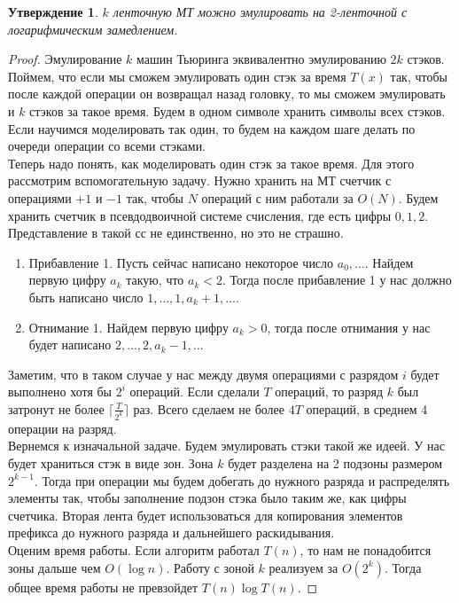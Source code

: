 \documentclass[12pt, letterpaper]{article}
\newtheorem{prop}{Утверждение}[section]
\begin{document}
\begin{prop}
$k$ ленточную МТ можно эмулировать на 2-ленточной с логарифмическим замедлением.
\end{prop}
\begin{proof}
Эмулирование $k$ машин Тьюринга эквивалентно эмулированию $2k$ стэков. Поймем, что если мы сможем эмулировать один стэк за время $T(x)$ так, чтобы после каждой операции он возвращал назад головку, то мы сможем эмулировать и $k$ стэков за такое время. Будем в одном символе хранить символы всех стэков. Если научимся моделировать так один, то будем на каждом шаге делать по очереди операции со всеми стэками. \\
Теперь надо понять, как моделировать один стэк за такое время. Для этого рассмотрим вспомогательную задачу. Нужно хранить на МТ счетчик с операциями $+1$ и $-1$ так, чтобы $N$ операций с ним работали за $O(N)$. Будем хранить счетчик в псевдодвоичной системе счисления, где есть цифры $0,1,2$. Представление в такой сс не единственно, но это не страшно.\\
\begin{enumerate}
\item Прибавление 1. Пусть сейчас написано некоторое число $a_0, \ldots$. Найдем первую цифру $a_k$ такую, что $a_k < 2$. Тогда после прибавление 1 у нас должно быть написано число $1, \ldots, 1,  a_k+1, \ldots$.
\item Отнимание 1. Найдем первую цифру $a_k>0$, тогда после отнимания у нас будет написано $2, \ldots, 2, a_k-1, \ldots$
\end{enumerate}
Заметим, что в таком случае у нас между двумя операциями с разрядом $i$ будет выполнено хотя бы $2^i$ операций. Если сделали $T$ операций, то разряд $k$ был затронут не более $\lceil \frac{T}{2^k} \rceil$ раз. Всего сделаем не более $4T$ операций, в среднем 4 операции на разряд.\\
Вернемся к изначальной задаче. Будем эмулировать стэки такой же идеей. У нас будет храниться стэк в виде зон. Зона $k$ будет разделена на 2 подзоны размером $2^{k-1}$. Тогда при операции мы будем добегать до нужного разряда и распределять элементы так, чтобы заполнение подзон стэка было таким же, как цифры счетчика. Вторая лента будет использоваться для копирования элементов префикса до нужного разряда и дальнейшего раскидывания.\\
Оценим время работы. Если алгоритм работал $T(n)$, то нам не понадобится зоны дальше чем $O(\log n)$. Работу с зоной $k$ реализуем за $O(2^k)$. Тогда общее время работы не превзойдет $T(n) \log  T(n)$. 

\end{proof}
\end{document}
